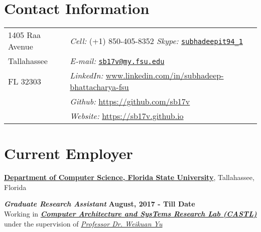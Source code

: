 \documentclass[margin,line]{res}
\begin{document}

\begin{resume}

\section{\sc Contact Information}
\begin{tabular}{@{}p{2in}p{4in}}
1405 Raa Avenue & {\it Cell:}  (+1) 850-405-8352 {\it Skype:}    
\href{https://join.skype.com/invite/S9OC09imwnsO}{\nolinkurl{subhadeepit94\_1}}\\
            
Tallahassee & {\it E-mail:} 
\href{mailto:sb17v@my.fsu.edu}{\nolinkurl{sb17v@my.fsu.edu} } \\
FL 32303 & {\it 
LinkedIn:} \url{www.linkedin.com/in/subhadeep-bhattacharya-fsu}
 \\
 & {\it Github:} \url{https://github.com/sb17v} \\
 & {\it Website:} \url{https://sb17v.github.io} \\
\end{tabular}

\vspace*{-.15in}



\section{\sc Current Employer}
{\bf \href{http://www.cs.fsu.edu/}{Department of Computer Science, Florida State University}}, Tallahassee, Florida

\vspace{-.4cm}
\textbf{{\em Graduate Research Assistant}} \hfill {\bf August, 2017 - Till Date}\\
Working in \textbf{\textit{\href{http://castl.cs.fsu.edu/doku.php/}{Computer Architecture and SysTems Research Lab (CASTL)}}} under the supervision of \textit{\href{https://www.cs.fsu.edu/~yuw/}{Professor Dr. Weikuan Yu}}

\vspace*{-.15in}


\end{resume}
\end{document}
